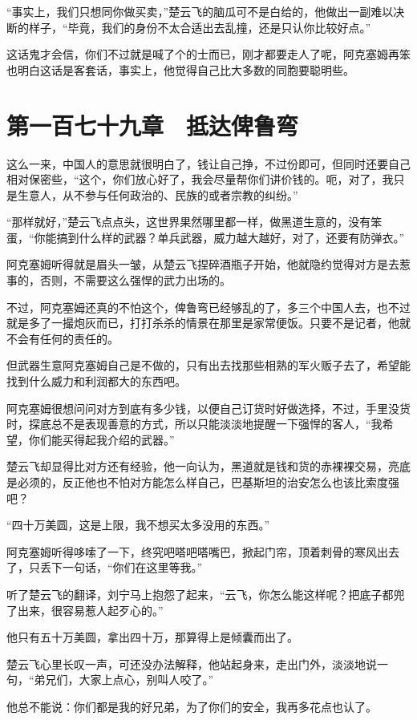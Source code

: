 “事实上，我们只想同你做买卖，”楚云飞的脑瓜可不是白给的，他做出一副难以决断的样子，“毕竟，我们的身份不太合适出去乱撞，还是只认你比较好点。”

这话鬼才会信，你们不过就是喊了个的士而已，刚才都要走人了呢，阿克塞姆再笨也明白这话是客套话，事实上，他觉得自己比大多数的同胞要聪明些。

\section{第一百七十九章　抵达俾鲁弯}

这么一来，中国人的意思就很明白了，钱让自己挣，不过份即可，但同时还要自己相对保密些，“这个，你们放心好了，我会尽量帮你们讲价钱的。呃，对了，我只是生意人，从不参与任何政治的、民族的或者宗教的纠纷。”

“那样就好，”楚云飞点点头，这世界果然哪里都一样，做黑道生意的，没有笨蛋，“你能搞到什么样的武器？单兵武器，威力越大越好，对了，还要有防弹衣。”

阿克塞姆听得就是眉头一皱，从楚云飞捏碎酒瓶子开始，他就隐约觉得对方是去惹事的，否则，不需要这么强悍的武力出场的。

不过，阿克塞姆还真的不怕这个，俾鲁弯已经够乱的了，多三个中国人去，也不过就是多了一撮炮灰而已，打打杀杀的情景在那里是家常便饭。只要不是记者，他就不会有任何的责任的。

但武器生意阿克塞姆自己是不做的，只有出去找那些相熟的军火贩子去了，希望能找到什么威力和利润都大的东西吧。

阿克塞姆很想问问对方到底有多少钱，以便自己订货时好做选择，不过，手里没货时，探底总不是表现善意的方式，所以只能淡淡地提醒一下强悍的客人，“我希望，你们能买得起我介绍的武器。”

楚云飞却显得比对方还有经验，他一向认为，黑道就是钱和货的赤裸裸交易，亮底是必须的，反正他也不怕对方能怎么样自己，巴基斯坦的治安怎么也该比索度强吧？

“四十万美圆，这是上限，我不想买太多没用的东西。”

阿克塞姆听得哆嗦了一下，终究吧嗒吧嗒嘴巴，掀起门帘，顶着刺骨的寒风出去了，只丢下一句话，“你们在这里等我。”

听了楚云飞的翻译，刘宁马上抱怨了起来，“云飞，你怎么能这样呢？把底子都兜了出来，很容易惹人起歹心的。”

他只有五十万美圆，拿出四十万，那算得上是倾囊而出了。

楚云飞心里长叹一声，可还没办法解释，他站起身来，走出门外，淡淡地说一句，“弟兄们，大家上点心，别叫人咬了。”

他总不能说：你们都是我的好兄弟，为了你们的安全，我再多花点也认了。

